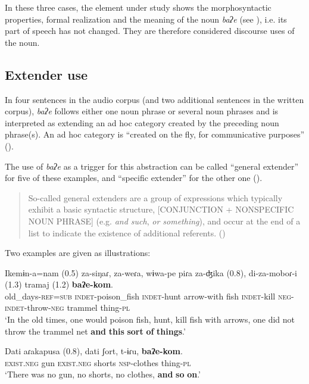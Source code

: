 \documentclass[output=paper]{langscibook}
\begin{document}
In these three cases, the element under study shows the morphosyntactic properties, formal realization and the meaning of the noun \textit{baʔe} (see ), i.e. its part of speech has not changed. They are therefore considered discourse uses of the noun.

\subsection{Extender use}
\label{sec:rose:4.1}
In four sentences in the audio corpus (and two additional sentences in the written corpus), \textit{baʔe} follows either one noun phrase or several noun phrases and is interpreted as extending an ad hoc category created by the preceding noun phrase(s). An ad hoc category is “created on the fly, for communicative purposes” (\citealt[2]{MauriMauri2018}). 

The use of \textit{baʔe} as a trigger for this abstraction can be called “general extender” for five of these examples, and “specific extender” for the other one (\citealt[1--2; 40--41]{OverstreetOverstreet2021}).  

\begin{quote}
So-called general extenders are a group of expressions which typically exhibit a basic syntactic structure, [CONJUNCTION + NONSPECIFIC NOUN PHRASE] (e.g. \textit{and such}, \textit{or something}), and occur at the end of a list to indicate the existence of additional referents. (\citealt[12]{MauriMauri2018}) 
\end{quote}

Two examples are given as illustrations:

\ea \label{ex:rose:35}
\gll Ikemɨn-a=nam (0.5) za-siŋaɾ, za-weɾa, wɨwa-pe piɾa za-ʤika (0.8), di-za-moboɾ-i (1.3) tramaj (1.2) \textbf{baʔe-kom}.\\
old\_days-\textsc{ref=sub} {} \textsc{indet}-poison\_fish \textsc{indet}-hunt arrow-with  fish \textsc{indet}-kill {} \textsc{neg-indet}-throw-\textsc{neg} {} trammel {} thing-\textsc{pl}\\
\glt  ‘In the old times, one would poison fish, hunt, kill fish with arrows, one did not throw the trammel net \textbf{and} \textbf{this} \textbf{sort} \textbf{of} \textbf{things}.’ 
\z 

\ea \label{ex:rose:36}
\gll Dati  aɾakapusa (0.8),   dati  ʃort,   t-ɨɾu, \textbf{baʔe-kom}. \\ 
\textsc{exist.neg} gun {} \textsc{exist.neg} shorts \textsc{nsp}-clothes thing-\textsc{pl}\\
\glt ‘There was no gun, no shorts, no clothes, \textbf{and} \textbf{so} \textbf{on}.’ 
\z 
\end{document}
